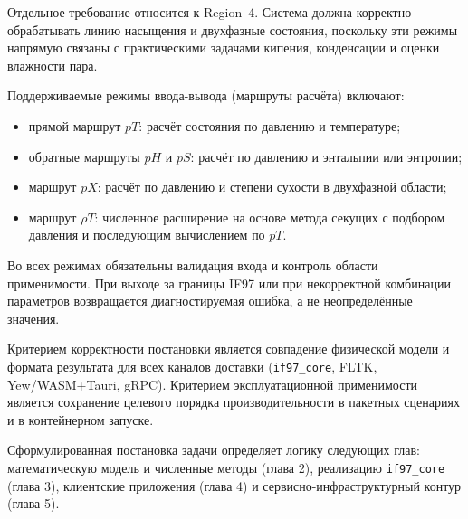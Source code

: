 Отдельное требование относится к Region~4.
Система должна корректно обрабатывать линию насыщения и двухфазные состояния,
поскольку эти режимы напрямую связаны с практическими задачами кипения,
конденсации и оценки влажности пара.

Поддерживаемые режимы ввода-вывода (маршруты расчёта) включают:
\begin{itemize}
\item прямой маршрут $pT$: расчёт состояния по давлению и температуре;
\item обратные маршруты $pH$ и $pS$: расчёт по давлению и энтальпии или энтропии;
\item маршрут $pX$: расчёт по давлению и степени сухости в двухфазной области;
\item маршрут $\rho T$: численное расширение на основе метода секущих
с подбором давления и последующим вычислением по $pT$.
\end{itemize}

Во всех режимах обязательны валидация входа и контроль области применимости.
При выходе за границы IF97 или при некорректной комбинации параметров
возвращается диагностируемая ошибка, а не неопределённые значения.

Критерием корректности постановки является
совпадение физической модели и формата результата
для всех каналов доставки (\texttt{if97\_core}, FLTK, Yew/WASM+Tauri, gRPC).
Критерием эксплуатационной применимости является
сохранение целевого порядка производительности
в пакетных сценариях и в контейнерном запуске.

Сформулированная постановка задачи определяет логику следующих глав:
математическую модель и численные методы (глава 2),
реализацию \texttt{if97\_core} (глава 3),
клиентские приложения (глава 4)
и сервисно-инфраструктурный контур (глава 5).
